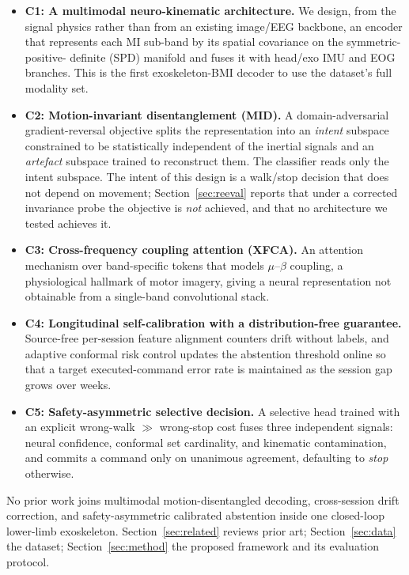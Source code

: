 \documentclass[conference]{IEEEtran}
\begin{document}
\begin{itemize}
\item \textbf{C1: A multimodal neuro-kinematic architecture.} We design, from the
signal physics rather than from an existing image/EEG backbone, an encoder that
represents each MI sub-band by its spatial covariance on the symmetric-positive-
definite (SPD) manifold and fuses it with head/exo IMU and EOG branches. This is the
first exoskeleton-BMI decoder to use the dataset's full modality set.
\item \textbf{C2: Motion-invariant disentanglement (MID).} A domain-adversarial
gradient-reversal objective splits the representation into an \emph{intent} subspace
constrained to be statistically independent of the inertial signals and an
\emph{artefact} subspace trained to reconstruct them. The classifier reads only the
intent subspace. The intent of this design is a walk/stop decision that does not
depend on movement; Section~\ref{sec:reeval} reports that under a corrected
invariance probe the objective is \emph{not} achieved, and that no architecture we
tested achieves it.
\item \textbf{C3: Cross-frequency coupling attention (XFCA).} An attention
mechanism over band-specific tokens that models $\mu$--$\beta$ coupling, a
physiological hallmark of motor imagery, giving a neural representation not obtainable
from a single-band convolutional stack.
\item \textbf{C4: Longitudinal self-calibration with a distribution-free
guarantee.} Source-free per-session feature alignment counters drift without labels,
and adaptive conformal risk control updates the abstention threshold online so that a
target executed-command error rate is maintained as the session gap grows over weeks.
\item \textbf{C5: Safety-asymmetric selective decision.} A selective head trained
with an explicit wrong-walk $\gg$ wrong-stop cost fuses three independent signals: 
neural confidence, conformal set cardinality, and kinematic contamination, and
commits a command only on unanimous agreement, defaulting to \emph{stop} otherwise.
\end{itemize}
No prior work joins multimodal motion-disentangled decoding, cross-session drift
correction, and safety-asymmetric calibrated abstention inside one closed-loop
lower-limb exoskeleton. Section~\ref{sec:related} reviews prior art;
Section~\ref{sec:data} the dataset; Section~\ref{sec:method} the proposed framework
and its evaluation protocol.
\end{document}
